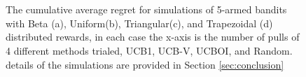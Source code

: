 \begin{figure}[t]
\centering
    \subfigure[]%
{\resizebox{0.5\linewidth}{!}{}\label{fig:1a}}%
    \subfigure[]%
{\resizebox{0.5\linewidth}{!}{}\label{fig:1b}}%
\\
    \subfigure[]%
{\resizebox{0.5\linewidth}{!}{}\label{fig:1c}}%
	\subfigure[]%
{\resizebox{0.5\linewidth}{!}{}\label{fig:1e}}%
\\
\caption{The cumulative average regret for simulations of 5-armed bandits with Beta (a), Uniform(b), Triangular(c), and Trapezoidal (d) distributed rewards, in each case the x-axis is the number of pulls of 4 different methods trialed, UCB1, UCB-V, UCBOI, and Random. details of the simulations are provided in Section \ref{sec:conclusion}}
\label{biggraph44}\end{figure}
